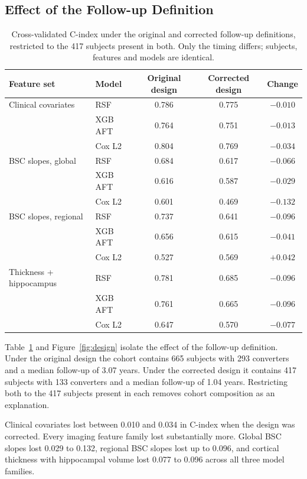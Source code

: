 \documentclass[blue]{ludusofficial}  %
\begin{document}
\subsection{Effect of the Follow-up Definition}

\begin{table}[t!]
\centering
\caption{Cross-validated C-index under the original and corrected follow-up definitions, restricted to the 417 subjects present in both. Only the timing differs; subjects, features and models are identical.}
\label{tab:design}
\begin{tabular}{llccc}
\hline
\textbf{Feature set} & \textbf{Model} & \textbf{Original design} & \textbf{Corrected design} & \textbf{Change} \\
\hline
Clinical covariates & RSF & 0.786 & 0.775 & $-0.010$ \\
 & XGB AFT & 0.764 & 0.751 & $-0.013$ \\
 & Cox L2 & 0.804 & 0.769 & $-0.034$ \\
\hline
BSC slopes, global & RSF & 0.684 & 0.617 & $-0.066$ \\
 & XGB AFT & 0.616 & 0.587 & $-0.029$ \\
 & Cox L2 & 0.601 & 0.469 & $-0.132$ \\
\hline
BSC slopes, regional & RSF & 0.737 & 0.641 & $-0.096$ \\
 & XGB AFT & 0.656 & 0.615 & $-0.041$ \\
 & Cox L2 & 0.527 & 0.569 & $+0.042$ \\
\hline
Thickness + hippocampus & RSF & 0.781 & 0.685 & $-0.096$ \\
 & XGB AFT & 0.761 & 0.665 & $-0.096$ \\
 & Cox L2 & 0.647 & 0.570 & $-0.077$ \\
\hline
\end{tabular}
\end{table}

Table~\ref{tab:design} and Figure~\ref{fig:design} isolate the effect of the follow-up definition. Under the original design the cohort contains 665 subjects with 293 converters and a median follow-up of 3.07 years. Under the corrected design it contains 417 subjects with 133 converters and a median follow-up of 1.04 years. Restricting both to the 417 subjects present in each removes cohort composition as an explanation.

Clinical covariates lost between 0.010 and 0.034 in C-index when the design was corrected. Every imaging feature family lost substantially more. Global BSC slopes lost 0.029 to 0.132, regional BSC slopes lost up to 0.096, and cortical thickness with hippocampal volume lost 0.077 to 0.096 across all three model families.
\end{document}
